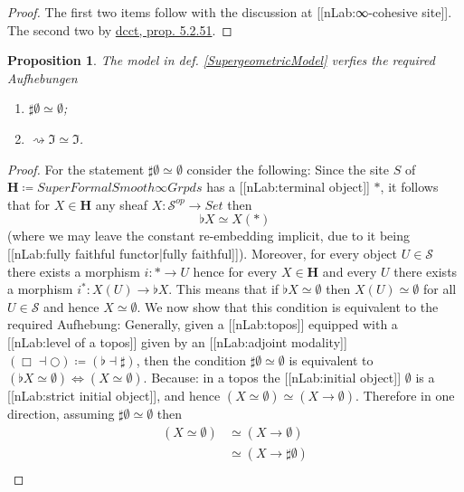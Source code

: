 \documentclass[12pt,titlepage]{article}
\theoremstyle{plain}
\newtheorem{prop}{Proposition}
\theoremstyle{definition}
\theoremstyle{remark}
\begin{document}
\begin{proof}
The first two items follow with the discussion at [[nLab:∞-cohesive site]]. The second two by \hyperlink{dcct}{dcct, prop. 5.2.51}.
\end{proof}
\begin{prop}
\label{SublationsRealized}\hypertarget{SublationsRealized}{}
The model in def. \ref{SupergeometricModel} verfies the required Aufhebungen
\begin{enumerate}%
\item $\sharp \emptyset \simeq \emptyset$;
\item $\rightsquigarrow \Im \simeq \Im$.
\end{enumerate}
\end{prop}
\begin{proof}
For the statement $\sharp \emptyset \simeq \emptyset$ consider the following:
Since the site $S$ of $\mathbf{H} \coloneqq SuperFormalSmooth\infty Grpds$ has a [[nLab:terminal object]] $\ast$, it follows that for $X\in \mathbf{H}$ any sheaf $X \colon \mathcal{S}^{op}\to Set$ then
\begin{displaymath}
\flat X \simeq X(\ast)
\end{displaymath}
(where we may leave the constant re-embedding implicit, due to it being [[nLab:fully faithful functor|fully faithful]]).
Moreover, for every object $U\in \mathcal{S}$ there exists a morphism $i \colon \ast \to U$ hence for every $X\in \mathbf{H}$ and every $U$ there exists a morphism $i^\ast \colon X(U)\to \flat X$. This means that if $\flat X \simeq \emptyset$ then $X(U) \simeq \emptyset$ for all $U \in \mathcal{S}$ and hence $X\simeq \emptyset$.
We now show that this condition is equivalent to the required Aufhebung:
Generally, given a [[nLab:topos]] equipped with a [[nLab:level of a topos]] given by an [[nLab:adjoint modality]] $(\Box\dashv \bigcirc) \coloneqq (\flat \dashv \sharp)$, then the condition $\sharp \emptyset \simeq \emptyset$ is equivalent to $(\flat X \simeq \emptyset) \Leftrightarrow (X \simeq \emptyset)$.
Because: in a topos the [[nLab:initial object]] $\emptyset$ is a [[nLab:strict initial object]], and hence $(X \simeq \emptyset) \simeq (X \to \emptyset)$. Therefore in one direction, assuming $\sharp \emptyset \simeq \emptyset$ then
\begin{displaymath}
\begin{aligned}
    (X \simeq \emptyset)
    & \simeq
    (X \to \emptyset)
    \\
    & \simeq (X \to \sharp \emptyset)
    \\

\end{aligned}
\end{displaymath}
\end{proof}
\end{document}
